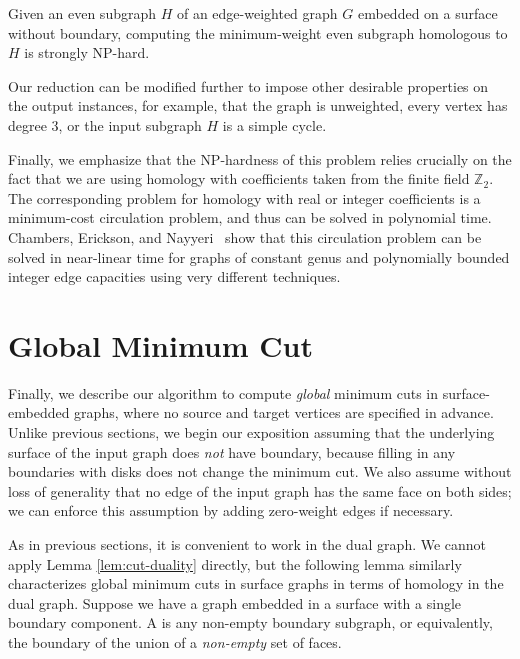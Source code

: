 \documentclass[letterpaper,review]{siamart190516}
\def\Z{\mathbb{Z}}
\begin{document}
{\begin{theorem}
Given an even subgraph $H$ of an edge-weighted graph $G$ embedded on a surface without boundary, computing the minimum-weight even subgraph homologous to $H$ is strongly {NP}-hard.
\end{theorem}
Our reduction can be modified further to impose other desirable properties on the output instances, for example, that the graph is unweighted, every vertex has degree $3$, or the input subgraph $H$ is a simple cycle.

Finally, we emphasize that the {NP}-hardness of this problem relies crucially on the fact that we are using homology with coefficients taken from the finite field $\Z_2$.  The corresponding problem for homology with real or integer coefficients is a minimum-cost circulation problem, and thus can be solved in polynomial time.
Chambers, Erickson, and Nayyeri~\cite{cen-hfcc-12} show that this circulation problem can be solved in near-linear time for graphs of constant genus and polynomially bounded integer edge capacities using very different techniques.


\def\minSS{X}

\section{Global Minimum Cut}
\label{sec:global}

Finally, we describe our algorithm to compute \emph{global} minimum cuts in surface-embedded graphs, where no source and target vertices are specified in advance.  
Unlike previous sections, we begin our exposition assuming that the underlying surface of the input
graph does \emph{not} have boundary, because filling in any boundaries with disks does not change
the minimum cut.
We also assume without loss of generality that no edge of the input graph has the same face on both
sides; we can enforce this assumption by adding zero-weight edges if necessary.

As in previous sections, it is convenient to work in the dual graph.  We cannot apply Lemma \ref{lem:cut-duality} directly, but the following lemma similarly characterizes global minimum cuts in surface graphs in terms of homology in the dual graph.
Suppose we have a graph embedded in a surface with a single boundary component.
A  is any non-empty boundary subgraph, or equivalently, the boundary of the union of a \emph{non-empty} set of faces.

}
\end{document}

